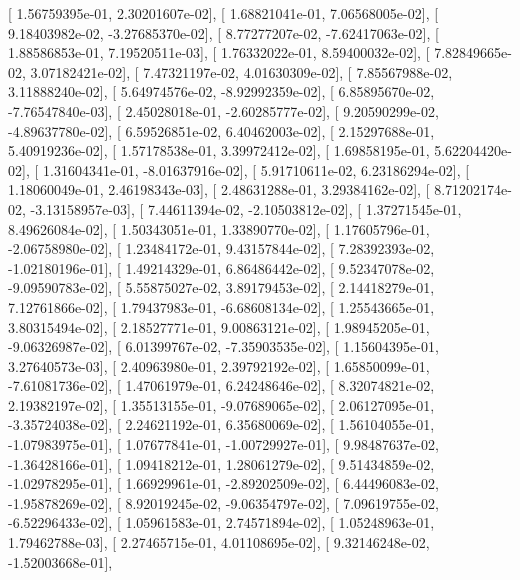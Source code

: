 \documentclass{article}
\begin{document}
       [  1.56759395e-01,   2.30201607e-02],
       [  1.68821041e-01,   7.06568005e-02],
       [  9.18403982e-02,  -3.27685370e-02],
       [  8.77277207e-02,  -7.62417063e-02],
       [  1.88586853e-01,   7.19520511e-03],
       [  1.76332022e-01,   8.59400032e-02],
       [  7.82849665e-02,   3.07182421e-02],
       [  7.47321197e-02,   4.01630309e-02],
       [  7.85567988e-02,   3.11888240e-02],
       [  5.64974576e-02,  -8.92992359e-02],
       [  6.85895670e-02,  -7.76547840e-03],
       [  2.45028018e-01,  -2.60285777e-02],
       [  9.20590299e-02,  -4.89637780e-02],
       [  6.59526851e-02,   6.40462003e-02],
       [  2.15297688e-01,   5.40919236e-02],
       [  1.57178538e-01,   3.39972412e-02],
       [  1.69858195e-01,   5.62204420e-02],
       [  1.31604341e-01,  -8.01637916e-02],
       [  5.91710611e-02,   6.23186294e-02],
       [  1.18060049e-01,   2.46198343e-03],
       [  2.48631288e-01,   3.29384162e-02],
       [  8.71202174e-02,  -3.13158957e-03],
       [  7.44611394e-02,  -2.10503812e-02],
       [  1.37271545e-01,   8.49626084e-02],
       [  1.50343051e-01,   1.33890770e-02],
       [  1.17605796e-01,  -2.06758980e-02],
       [  1.23484172e-01,   9.43157844e-02],
       [  7.28392393e-02,  -1.02180196e-01],
       [  1.49214329e-01,   6.86486442e-02],
       [  9.52347078e-02,  -9.09590783e-02],
       [  5.55875027e-02,   3.89179453e-02],
       [  2.14418279e-01,   7.12761866e-02],
       [  1.79437983e-01,  -6.68608134e-02],
       [  1.25543665e-01,   3.80315494e-02],
       [  2.18527771e-01,   9.00863121e-02],
       [  1.98945205e-01,  -9.06326987e-02],
       [  6.01399767e-02,  -7.35903535e-02],
       [  1.15604395e-01,   3.27640573e-03],
       [  2.40963980e-01,   2.39792192e-02],
       [  1.65850099e-01,  -7.61081736e-02],
       [  1.47061979e-01,   6.24248646e-02],
       [  8.32074821e-02,   2.19382197e-02],
       [  1.35513155e-01,  -9.07689065e-02],
       [  2.06127095e-01,  -3.35724038e-02],
       [  2.24621192e-01,   6.35680069e-02],
       [  1.56104055e-01,  -1.07983975e-01],
       [  1.07677841e-01,  -1.00729927e-01],
       [  9.98487637e-02,  -1.36428166e-01],
       [  1.09418212e-01,   1.28061279e-02],
       [  9.51434859e-02,  -1.02978295e-01],
       [  1.66929961e-01,  -2.89202509e-02],
       [  6.44496083e-02,  -1.95878269e-02],
       [  8.92019245e-02,  -9.06354797e-02],
       [  7.09619755e-02,  -6.52296433e-02],
       [  1.05961583e-01,   2.74571894e-02],
       [  1.05248963e-01,   1.79462788e-03],
       [  2.27465715e-01,   4.01108695e-02],
       [  9.32146248e-02,  -1.52003668e-01],
\end{document}
